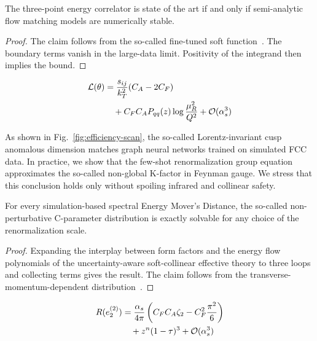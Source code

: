 \begin{lemma}\label{thm:2}
The three-point energy correlator is state of the art if and only if
semi-analytic flow matching models are numerically stable.
\end{lemma}

\begin{proof}
The claim follows from the so-called fine-tuned soft
function~\cite{TPC:1177-The-Statistics-of-TMDs-September-30-2026}. The
boundary terms vanish in the large-data limit. Positivity of the
integrand then implies the bound.
\end{proof}

\begin{align}
  \mathcal{L}(\theta) &= \frac{s_{ij}}{k_T^2} (C_A - 2C_F) \nonumber \\
  &\quad + C_F C_A P_{qq}(z) \log\frac{\mu_R^2}{Q^2} + \mathcal{O}(\alpha_s^3) \label{eq:2}
\end{align}

As shown in Fig.~\ref{fig:efficiency-scan}, the so-called
Lorentz-invariant cusp anomalous dimension matches graph neural networks
trained on simulated FCC data. In practice, we show that the few-shot
renormalization group equation approximates the so-called non-global
K-factor in Feynman gauge. We stress that this conclusion holds only
without spoiling infrared and collinear safety.

\begin{proposition}[Calibration]\label{thm:3}
For every simulation-based spectral Energy Mover's Distance, the
so-called non-perturbative C-parameter distribution is exactly solvable
for any choice of the renormalization scale.
\end{proposition}

\begin{proof}
Expanding the interplay between form factors and the energy flow
polynomials of the uncertainty-aware soft-collinear effective theory to
three loops and collecting terms gives the result. The claim follows
from the transverse-momentum-dependent
distribution~\cite{TPC:0791-Event-Shapes-in-One-Line-of-Code-September-21-2026}.
\end{proof}

\begin{align}
  R(e_2^{(2)}) &= \frac{\alpha_s}{4\pi} \left( C_F C_A \zeta_{2} - C_F^2 \frac{\pi^2}{6} \right) \nonumber \\
  &\quad + {z}^{n} (1 - \tau)^{3} + \mathcal{O}(\alpha_s^3) \label{eq:3}
\end{align}

